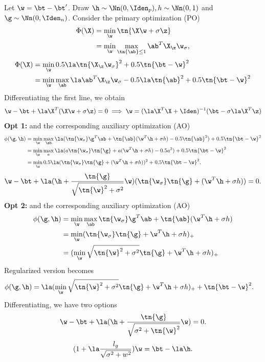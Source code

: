 Let $\w=\bt-\bt'$. Draw $\h\sim\Nn(0,\Iden_p),h\sim\Nn(0,1)$ and $\g\sim\Nn(0,\Iden_n)$. Consider the primary optimization (PO)
\begin{align}
\Phi(\X)&=\min_{\w}\tn{\X\w+\sigma \z}\\
&=\min_{\w}\max_{\tn{\ab}\leq 1}\ab^T\X_{\z}\w_{\sigma},
\end{align}
\begin{align}
\Phi(\X)&=\min_{\w}0.5\la\tn{\X_\z\w_\sigma}^2+0.5\tn{\bt-\w}^2\\
&=\min_{\w}\max_{\ab}\la\ab^T\X_{\z}\w_{\sigma}-0.5\la\tn{\ab}^2+0.5\tn{\bt-\w}^2
\end{align}
Differentiating the first line, we obtain
\[
\w-\bt+\la \X^T(\X\w+\sigma \z)=0\implies \w=(\la \X^T\X+\Iden)^{-1}(\bt-\sigma\la\X^T\z)
\]
{\bf{Opt 1:}} and the corresponding auxiliary optimization (AO)
\begin{align}
\phi(\g,\h)&=\min_{\w}\max_{\ab} \la(\tn{\w_{\sigma}}\g^T\ab+\tn{\ab}(\w^T\h+\sigma h)-0.5\tn{\ab}^2)+0.5\tn{\bt-\w}^2\\
&=\min_{\w}\max_{a} \la(a\tn{\w_{\sigma}}\tn{\g}+a(\w^T\h+\sigma h)-0.5a^2)+0.5\tn{\bt-\w}^2\\
&=\min_{\w} 0.5\la(\tn{\w_{\sigma}}\tn{\g}+(\w^T\h+\sigma h))^2+0.5\tn{\bt-\w}^2.
\end{align}
\[
\w-\bt+\la(\h+\frac{\tn{\g}}{\sqrt{\tn{\w}^2+\sigma^2}}\w)(\tn{\w_{\sigma}}\tn{\g}+(\w^T\h+\sigma h))=0.
\]
{\bf{Opt 2:}} and the corresponding auxiliary optimization (AO)
\begin{align}
\phi(\g,\h)&=\min_{\w}\max_{\ab} \tn{\w_{\sigma}}\g^T\ab+\tn{\ab}(\w^T\h+\sigma h)\\\
&=\min_{\w}(\tn{\w_{\sigma}}\tn{\g}+\w^T\h+\sigma h)_+\\
&=(\min_{\w}\sqrt{\tn{\w}^2+\sigma^2}\tn{\g}+\w^T\h+\sigma h)_+
\end{align}
Regularized version becomes
\begin{align}
\phi(\g,\h)&=\la (\min_{\w}\sqrt{\tn{\w}^2+\sigma^2}\tn{\g}+\w^T\h+\sigma h)_++\tn{\bt-\w}^2.
\end{align}
Differentiating, we have two options
\begin{align}
\w-\bt+\la(\h+\frac{\tn{\g}}{\sqrt{\sigma^2+\tn{\w}^2}}\w)=0.
\end{align}
\[
(1+\la \frac{l_g}{\sqrt{\sigma^2+w^2}})\w=\bt-\la \h.
\]
